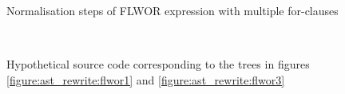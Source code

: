 \begin{figure}[!h]
{{			\label{figure:ast_rewrite:flwor2}
		}
		\quad
	}
	\caption{Normalisation steps of FLWOR expression with multiple for-clauses}
\end{figure}

\begin{figure}[!h]
	\centering
	\mbox{
		\quad
	}
	\caption{Hypothetical source code corresponding to the trees in figures
		\ref{figure:ast_rewrite:flwor1} and \ref{figure:ast_rewrite:flwor3}}
	\label{figure:ast_rewrite:flwor_src}
\end{figure}

